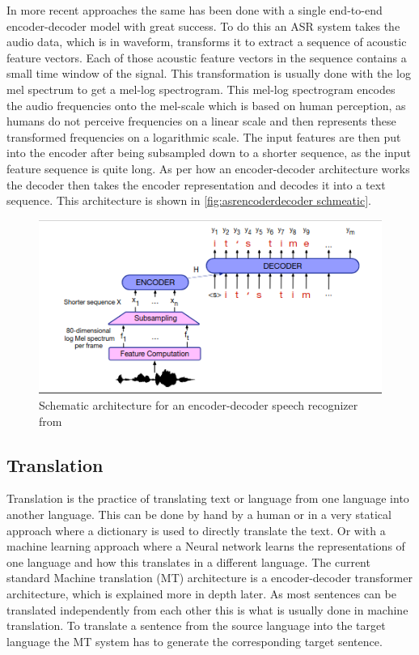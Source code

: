 In more recent approaches the same has been done with a single end-to-end encoder-decoder model with great success. 
To do this an ASR system takes the audio data, which is in waveform, transforms it to extract a sequence of acoustic feature vectors. 
Each of those acoustic feature vectors in the sequence contains a small time window of the signal. 
This transformation is usually done with the log mel spectrum to get a mel-log spectrogram. \cite[chapter~16]{jm3}
This mel-log spectrogram encodes the audio frequencies onto the mel-scale which is based on human perception, as humans do not perceive frequencies on a linear scale \cite{mellogscale} and then represents these transformed frequencies on a logarithmic scale. 
The input features are then put into the encoder after being subsampled down to a shorter sequence, as the input feature sequence is quite long. 
As per how an encoder-decoder architecture works the decoder then takes the encoder representation and decodes it into a text sequence. 
This architecture is shown in \autoref{fig:asrencoderdecoder schmeatic}.
\begin{figure}[ht]
    \centering
    \includegraphics[width=\linewidth]{Latex//sections//images/asrencoderdecoder.png}
    \caption{Schematic architecture for an encoder-decoder speech recognizer from \cite{jm3}}
    \label{fig:asrencoderdecoder schmeatic}
\end{figure}


\subsection{Translation}
Translation is the practice of translating text or language from one language into another language. 
This can be done by hand by a human or in a very statical approach where a dictionary is used to directly translate the text. 
Or with a machine learning approach where a Neural network learns the representations of one language and how this translates in a different language. 
The current standard Machine translation (MT) architecture is a encoder-decoder transformer architecture, which is explained more in depth later. 
As most sentences can be translated independently from each other this is what is usually done in machine translation. To translate a sentence from the source language into the target language the MT system has to generate the corresponding target sentence. \cite[chapter~13.2]{jm3}

